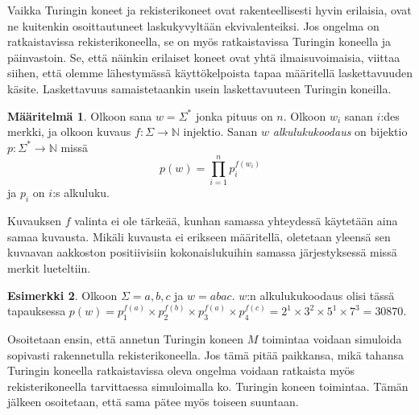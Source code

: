 \documentclass[a4paper, 12pt]{article}
\theoremstyle{definition}
\newtheorem{mydef}{Määritelmä}
\newtheorem{example}[mydef]{Esimerkki}
\theoremstyle{plain}
\begin{document}
Vaikka Turingin koneet ja rekisterikoneet ovat rakenteellisesti hyvin erilaisia, ovat ne kuitenkin osoittautuneet laskukyvyltään ekvivalenteiksi. Jos ongelma on ratkaistavissa rekisterikoneella, se on myös ratkaistavissa Turingin koneella ja päinvastoin. Se, että näinkin erilaiset koneet ovat yhtä ilmaisuvoimaisia, viittaa siihen, että olemme lähestymässä käyttökelpoista tapaa määritellä laskettavuuden käsite. Laskettavuus samaistetaankin usein laskettavuuteen Turingin koneilla.

\begin{mydef}
Olkoon sana $w = \Sigma^*$ jonka pituus on $n$. Olkoon $w_i$ sanan $i$:des merkki, ja olkoon kuvaus $f: \Sigma \rightarrow \mathbb{N}$ injektio. Sanan $w$ \emph{alkulukukoodaus} on bijektio $p: \Sigma^* \rightarrow \mathbb{N}$ missä $$p(w) = \prod_{i=1}^{n} p_i^{f(w_i)}$$ ja $p_i$ on $i$:s alkuluku.
\end{mydef}
Kuvauksen $f$ valinta ei ole tärkeää, kunhan samassa yhteydessä käytetään aina samaa kuvausta. Mikäli kuvausta ei erikseen määritellä, oletetaan yleensä sen kuvaavan aakkoston positiivisiin kokonaislukuihin samassa järjestyksessä missä merkit lueteltiin.
\begin{example}
Olkoon $\Sigma = {a, b, c}$ ja $w = abac$. $w$:n alkulukukoodaus olisi tässä tapauksessa $p(w) = p_1^{f(a)} \times  p_2^{f(b)} \times  p_3^{f(a)} \times  p_4^{f(c)} = 2^1\times3^2\times5^1\times7^3 = 30870$.
\end{example}

Osoitetaan ensin, että annetun Turingin koneen $M$ toimintaa voidaan simuloida sopivasti rakennetulla rekisterikoneella. Jos tämä pitää paikkansa, mikä tahansa Turingin koneella ratkaistavissa oleva ongelma voidaan ratkaista myös rekisterikoneella tarvittaessa simuloimalla ko. Turingin koneen toimintaa. Tämän jälkeen osoitetaan, että sama pätee myös toiseen suuntaan.
\end{document}

